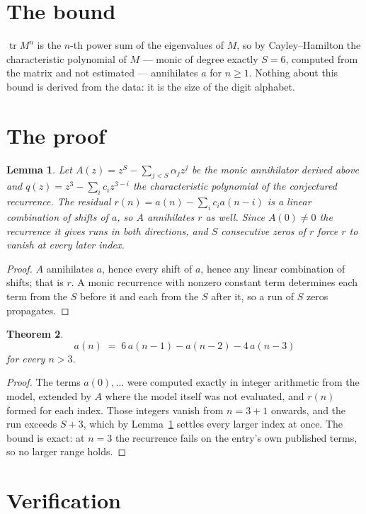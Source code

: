 \documentclass[11pt,a4paper]{article}
\theoremstyle{plain}
\newtheorem{theorem}{Theorem}
\newtheorem{lemma}[theorem]{Lemma}
\theoremstyle{definition}
\begin{document}
\section{The bound}

$\operatorname{tr}M^{n}$ is the $n$-th power sum of the eigenvalues of $M$, so by
Cayley--Hamilton the characteristic polynomial of $M$ --- monic of degree exactly $S=6$,
computed from the matrix and not estimated --- annihilates $a$ for $n\ge1$. Nothing about this
bound is derived from the data: it is the size of the digit alphabet.

\section{The proof}

\begin{lemma}\label{lem:crit}
Let $A(z)=z^S-\sum_{j<S}\alpha_jz^{j}$ be the monic annihilator derived above and
$q(z)=z^{3}-\sum_ic_iz^{3-i}$ the characteristic polynomial of the conjectured
recurrence. The residual $r(n)=a(n)-\sum_ic_ia(n-i)$ is a linear combination of shifts of $a$,
so $A$ annihilates $r$ as well. Since $A(0)\ne0$ the recurrence it gives runs in both
directions, and $S$ consecutive zeros of $r$ force $r$ to vanish at every later index.
\end{lemma}

\begin{proof}
$A$ annihilates $a$, hence every shift of $a$, hence any linear combination of shifts; that is
$r$. A monic recurrence with nonzero constant term determines each term from the $S$ before it
and each from the $S$ after it, so a run of $S$ zeros propagates.
\end{proof}

\begin{theorem}
\[
a(n)\;=\;6\,a(n-1) - a(n-2) - 4\,a(n-3)
\]
for every $n>3$.
\end{theorem}

\begin{proof}
The terms $a(0),\dots$ were computed exactly in integer arithmetic from the model, extended by
$A$ where the model itself was not evaluated, and $r(n)$ formed for each index. Those integers
vanish from $n=3+1$ onwards, and the run exceeds $S+3$, which by
Lemma~\ref{lem:crit} settles every larger index at once. The bound is exact: at $n=3$ the recurrence fails on the entry's own published terms, so no larger range holds.
\end{proof}

\section{Verification}
\end{document}
